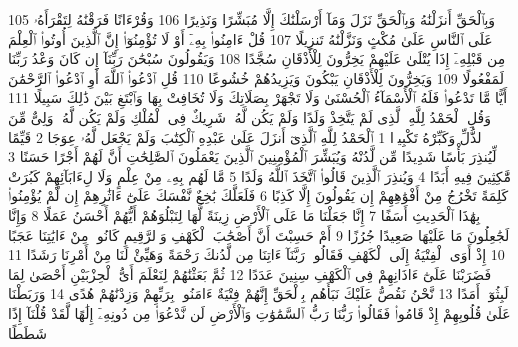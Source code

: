 {\tiny\colorbox{cl_aya}{105}} وَبِٱلْحَقِّ أَنزَلْنَٰهُ وَبِٱلْحَقِّ نَزَلَ وَمَآ أَرْسَلْنَٰكَ إِلَّا مُبَشِّرًا وَنَذِيرًا
{\tiny\colorbox{cl_aya}{106}} وَقُرْءَانًا فَرَقْنَٰهُ لِتَقْرَأَهُۥ عَلَى ٱلنَّاسِ عَلَىٰ مُكْثٍ وَنَزَّلْنَٰهُ تَنزِيلًا
{\tiny\colorbox{cl_aya}{107}} قُلْ ءَامِنُوا۟ بِهِۦٓ أَوْ لَا تُؤْمِنُوٓا۟ إِنَّ ٱلَّذِينَ أُوتُوا۟ ٱلْعِلْمَ مِن قَبْلِهِۦٓ إِذَا يُتْلَىٰ عَلَيْهِمْ يَخِرُّونَ لِلْأَذْقَانِ سُجَّدًا
{\tiny\colorbox{cl_aya}{108}} وَيَقُولُونَ سُبْحَٰنَ رَبِّنَآ إِن كَانَ وَعْدُ رَبِّنَا لَمَفْعُولًا
{\tiny\colorbox{cl_aya}{109}} وَيَخِرُّونَ لِلْأَذْقَانِ يَبْكُونَ وَيَزِيدُهُمْ خُشُوعًا
{\tiny\colorbox{cl_aya}{110}} قُلِ ٱدْعُوا۟ ٱللَّهَ أَوِ ٱدْعُوا۟ ٱلرَّحْمَٰنَ أَيًّا مَّا تَدْعُوا۟ فَلَهُ ٱلْأَسْمَآءُ ٱلْحُسْنَىٰ وَلَا تَجْهَرْ بِصَلَاتِكَ وَلَا تُخَافِتْ بِهَا وَٱبْتَغِ بَيْنَ ذَٰلِكَ سَبِيلًا
{\tiny\colorbox{cl_aya}{111}} وَقُلِ ٱلْحَمْدُ لِلَّهِ ٱلَّذِى لَمْ يَتَّخِذْ وَلَدًا وَلَمْ يَكُن لَّهُۥ شَرِيكٌ فِى ٱلْمُلْكِ وَلَمْ يَكُن لَّهُۥ وَلِىٌّ مِّنَ ٱلذُّلِّ وَكَبِّرْهُ تَكْبِيرًۢا
{\tiny\colorbox{cl_aya}{1}} ٱلْحَمْدُ لِلَّهِ ٱلَّذِىٓ أَنزَلَ عَلَىٰ عَبْدِهِ ٱلْكِتَٰبَ وَلَمْ يَجْعَل لَّهُۥ عِوَجَا
{\tiny\colorbox{cl_aya}{2}} قَيِّمًا لِّيُنذِرَ بَأْسًا شَدِيدًا مِّن لَّدُنْهُ وَيُبَشِّرَ ٱلْمُؤْمِنِينَ ٱلَّذِينَ يَعْمَلُونَ ٱلصَّٰلِحَٰتِ أَنَّ لَهُمْ أَجْرًا حَسَنًا
{\tiny\colorbox{cl_aya}{3}} مَّٰكِثِينَ فِيهِ أَبَدًا
{\tiny\colorbox{cl_aya}{4}} وَيُنذِرَ ٱلَّذِينَ قَالُوا۟ ٱتَّخَذَ ٱللَّهُ وَلَدًا
{\tiny\colorbox{cl_aya}{5}} مَّا لَهُم بِهِۦ مِنْ عِلْمٍ وَلَا لِءَابَآئِهِمْ كَبُرَتْ كَلِمَةً تَخْرُجُ مِنْ أَفْوَٰهِهِمْ إِن يَقُولُونَ إِلَّا كَذِبًا
{\tiny\colorbox{cl_aya}{6}} فَلَعَلَّكَ بَٰخِعٌ نَّفْسَكَ عَلَىٰٓ ءَاثَٰرِهِمْ إِن لَّمْ يُؤْمِنُوا۟ بِهَٰذَا ٱلْحَدِيثِ أَسَفًا
{\tiny\colorbox{cl_aya}{7}} إِنَّا جَعَلْنَا مَا عَلَى ٱلْأَرْضِ زِينَةً لَّهَا لِنَبْلُوَهُمْ أَيُّهُمْ أَحْسَنُ عَمَلًا
{\tiny\colorbox{cl_aya}{8}} وَإِنَّا لَجَٰعِلُونَ مَا عَلَيْهَا صَعِيدًا جُرُزًا
{\tiny\colorbox{cl_aya}{9}} أَمْ حَسِبْتَ أَنَّ أَصْحَٰبَ ٱلْكَهْفِ وَٱلرَّقِيمِ كَانُوا۟ مِنْ ءَايَٰتِنَا عَجَبًا
{\tiny\colorbox{cl_aya}{10}} إِذْ أَوَى ٱلْفِتْيَةُ إِلَى ٱلْكَهْفِ فَقَالُوا۟ رَبَّنَآ ءَاتِنَا مِن لَّدُنكَ رَحْمَةً وَهَيِّئْ لَنَا مِنْ أَمْرِنَا رَشَدًا
{\tiny\colorbox{cl_aya}{11}} فَضَرَبْنَا عَلَىٰٓ ءَاذَانِهِمْ فِى ٱلْكَهْفِ سِنِينَ عَدَدًا
{\tiny\colorbox{cl_aya}{12}} ثُمَّ بَعَثْنَٰهُمْ لِنَعْلَمَ أَىُّ ٱلْحِزْبَيْنِ أَحْصَىٰ لِمَا لَبِثُوٓا۟ أَمَدًا
{\tiny\colorbox{cl_aya}{13}} نَّحْنُ نَقُصُّ عَلَيْكَ نَبَأَهُم بِٱلْحَقِّ إِنَّهُمْ فِتْيَةٌ ءَامَنُوا۟ بِرَبِّهِمْ وَزِدْنَٰهُمْ هُدًى
{\tiny\colorbox{cl_aya}{14}} وَرَبَطْنَا عَلَىٰ قُلُوبِهِمْ إِذْ قَامُوا۟ فَقَالُوا۟ رَبُّنَا رَبُّ ٱلسَّمَٰوَٰتِ وَٱلْأَرْضِ لَن نَّدْعُوَا۟ مِن دُونِهِۦٓ إِلَٰهًا لَّقَدْ قُلْنَآ إِذًا شَطَطًا
